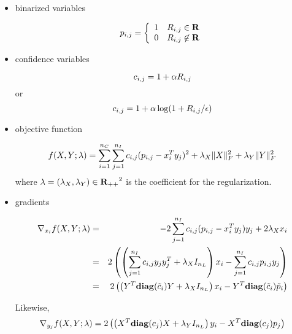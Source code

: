 \begin{itemize}

\item binarized variables

\begin{equation}
p_{i,j} = \left\{\begin{array}{ll}
1 & R_{i,j} \in \mathbf{R}
\\
0 & R_{i,j} \not\in \mathbf{R}
\end{array}\right.
\end{equation}

\item confidence variables

\begin{equation}
c_{i,j} = 1 + \alpha R_{i,j}
\end{equation}
or
\begin{equation}
c_{i,j} = 1 + \alpha \log(1 + R_{i,j}/\epsilon)
\end{equation}

\item objective function

\begin{equation}
f(X,Y; \lambda) = \sum_{i=1}^{{n_C}} \sum_{j=1}^{{n_I}} c_{i,j} (p_{i,j} - x_i^Ty_j)^2
+ \lambda_X \|X\|_F^2
+ \lambda_Y \|Y\|_F^2
\end{equation}
where $\lambda = (\lambda_X, \lambda_Y) \in {\mathbf{R}_{++}}^2$
is the coefficient for the regularization.

\item gradients

\begin{eqnarray}
\nonumber
\nabla_{x_i} f(X,Y; \lambda)
&=& -2 \sum_{j=1}^{{n_I}} c_{i,j} (p_{i,j} - x_i^Ty_j) y_j + 2 \lambda_X x_i
\\
\nonumber
&=& 2 \left( \left(
\sum_{j=1}^{{n_I}} c_{i,j} y_j y_j^T + \lambda_X I_{{n_L}}\right)x_i  - \sum_{j=1}^{{n_I}} c_{i,j} p_{i,j} y_j
\right)
\\
\label{eq:implicit-grad-x}
&=& 2 \left(\left( Y^T \mathbf{diag}(\tilde{c}_i)Y + \lambda_X I_{{n_L}} \right) x_i - Y^T \mathbf{diag}(\tilde{c}_i) \tilde{p}_i \right)
\end{eqnarray}

Likewise,
\begin{equation}
\label{eq:implicit-grad-x}
\nabla_{y_j} f(X,Y; \lambda)
= 2 \left(\left( X^T \mathbf{diag}(c_j)X + \lambda_Y I_{{n_L}} \right) y_i - X^T \mathbf{diag}(c_j)  p_j \right)
\end{equation}


\end{itemize}
